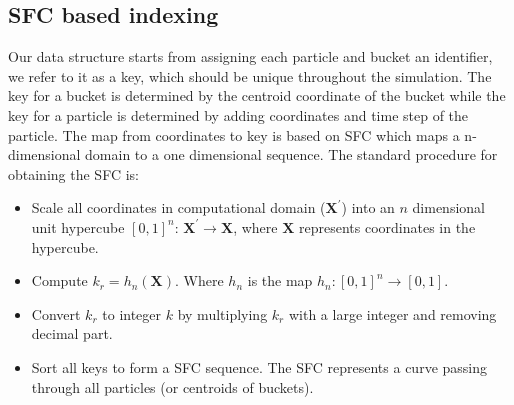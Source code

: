 \subsection{SFC based indexing}
Our data structure starts from assigning each particle and bucket an identifier, we refer to it as a key, which should be unique throughout the simulation. The key for a bucket is determined by the centroid coordinate of the bucket while the key for a particle is determined by adding coordinates and time step of the particle. The map from coordinates to key is based on SFC \cite{sagan2012space} which maps a n-dimensional domain to a one dimensional sequence. The standard procedure for obtaining the SFC is: 
\begin{itemize}
\item Scale all coordinates in computational domain ($\textbf{X}^\prime$) into an $n$ dimensional unit hypercube $[0,1]^n $: $\textbf{X}^\prime \rightarrow \textbf{X}$, where $\textbf{X}$ represents coordinates in the hypercube.
\item Compute $k_r = h_n(\textbf{X})$. Where $h_n$ is the map $h_n: [0,1]^n \rightarrow [0,1]$. 
\item Convert $k_r$ to integer $k$ by multiplying $k_r$ with a large integer and removing decimal part.
\item Sort all keys to form a SFC sequence. The SFC represents a curve passing through all particles (or centroids of buckets).
\end{itemize}
%
